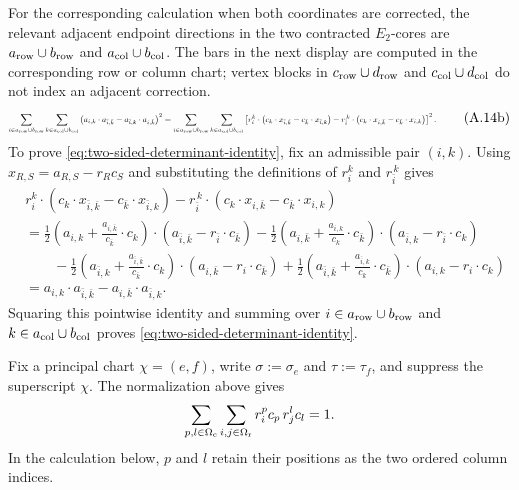 \documentclass[11pt]{article}
\begin{document}
For the corresponding calculation when both coordinates are corrected, the
relevant adjacent endpoint directions in the two contracted $E_2$-cores are
$a_{\rm row}\cup b_{\rm row}$ and
$a_{\rm col}\cup b_{\rm col}$.  The bars in the next
display are computed in the corresponding row or column chart; vertex blocks
in $c_{\rm row}\cup d_{\rm row}$ and
$c_{\rm col}\cup d_{\rm col}$ do not index an adjacent correction.
\begin{equation}\label{eq:two-sided-determinant-identity}
\resizebox{0.90\textwidth}{!}{$\displaystyle
\sum_{i\in a_{\rm row}\cup b_{\rm row}}
\sum_{k\in a_{\rm col}\cup b_{\rm col}}
\left(a_{i,k}\cdot a_{\bar i,\bar k}
-a_{\bar i,k}\cdot a_{i,\bar k}\right)^2
=
\sum_{i\in a_{\rm row}\cup b_{\rm row}}
\sum_{k\in a_{\rm col}\cup b_{\rm col}}
\left[
r_i^k\cdot\left(c_k\cdot x_{\bar i,\bar k}-c_{\bar k}\cdot x_{\bar i,k}\right)
-r_{\bar i}^{\,k}\cdot\left(c_k\cdot x_{i,\bar k}-c_{\bar k}\cdot x_{i,k}\right)
\right]^2 .
$}
\tag{A.14b}
\end{equation}
\noindent To prove \eqref{eq:two-sided-determinant-identity}, fix an
admissible pair $(i,k)$.  Using
$x_{R,S}=a_{R,S}-r_Rc_S$ and substituting the definitions of $r_i^k$ and
$r_{\bar i}^{\,k}$ gives
\[
\begin{aligned}
&r_i^k\cdot\left(c_k\cdot x_{\bar i,\bar k}
-c_{\bar k}\cdot x_{\bar i,k}\right)
-r_{\bar i}^{\,k}\cdot\left(c_k\cdot x_{i,\bar k}
-c_{\bar k}\cdot x_{i,k}\right)                                            \\
&=
\frac12\left(a_{i,k}+\frac{a_{i,\bar k}}{c_{\bar k}}\cdot c_k\right)
\cdot\left(a_{\bar i,\bar k}-r_{\bar i}\cdot c_{\bar k}\right)
-\frac12\left(a_{i,\bar k}+\frac{a_{i,k}}{c_k}\cdot c_{\bar k}\right)
\cdot\left(a_{\bar i,k}-r_{\bar i}\cdot c_k\right)                          \\
&\qquad
-\frac12\left(a_{\bar i,k}+\frac{a_{\bar i,\bar k}}{c_{\bar k}}\cdot c_k\right)
\cdot\left(a_{i,\bar k}-r_i\cdot c_{\bar k}\right)
+\frac12\left(a_{\bar i,\bar k}+\frac{a_{\bar i,k}}{c_k}\cdot c_{\bar k}\right)
\cdot\left(a_{i,k}-r_i\cdot c_k\right)                                      \\
&=
a_{i,k}\cdot a_{\bar i,\bar k}
-a_{i,\bar k}\cdot a_{\bar i,k}.
\end{aligned}
\]
Squaring this pointwise identity and summing over
$i\in a_{\rm row}\cup b_{\rm row}$ and
$k\in a_{\rm col}\cup b_{\rm col}$ proves
\eqref{eq:two-sided-determinant-identity}.

Fix a principal chart $\chi=(e,f)$, write
$\sigma:=\sigma_e$ and $\tau:=\tau_f$, and suppress the superscript $\chi$.
The normalization above gives
\[
\sum_{p,l\in\Omega_{\rm c}}\sum_{i,j\in\Omega_{\rm r}}
r_i^pc_p\,r_j^lc_l=1.
\]
In the calculation below, $p$ and $l$ retain their positions as the two ordered
column indices.
\end{document}
